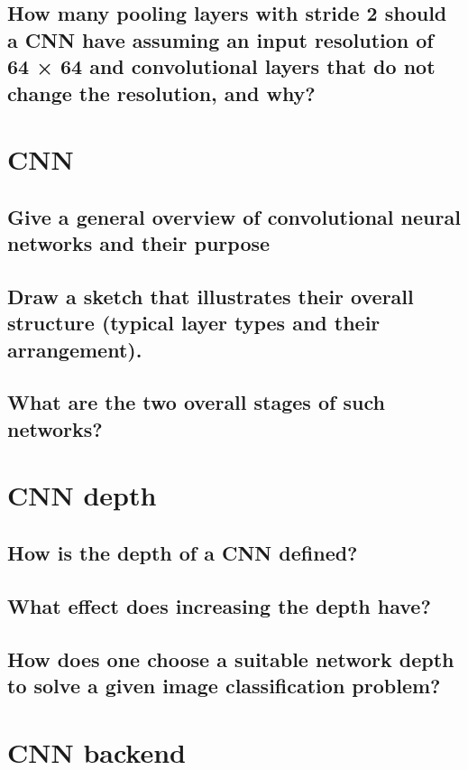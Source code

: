 \subsection{How many pooling layers with stride 2 should a CNN have assuming an input resolution of 64 × 64 and convolutional layers that do not change the resolution, and why?}

\section{CNN}

\subsection{Give a general overview of convolutional neural networks and their purpose}

\subsection{Draw a sketch that illustrates their overall structure (typical layer types and their arrangement).}

\subsection{What are the two overall stages of such networks?}

\section{CNN depth}

\subsection{How is the depth of a CNN defined?}

\subsection{What effect does increasing the depth have?}

\subsection{How does one choose a suitable network depth to solve a given image classification problem?}

\section{CNN backend}

